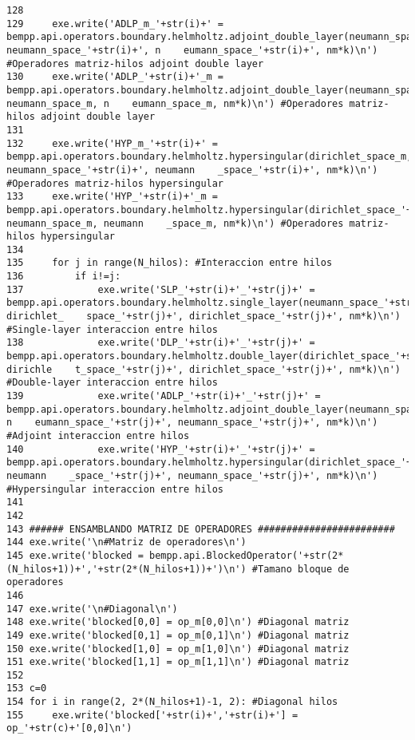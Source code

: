\documentclass[12pt,letterpaper]{article}
\numberwithin{equation}{section}
\begin{document}
\begin{lstlisting}
128 
129     exe.write('ADLP_m_'+str(i)+' = bempp.api.operators.boundary.helmholtz.adjoint_double_layer(neumann_space_m, neumann_space_'+str(i)+', n    eumann_space_'+str(i)+', nm*k)\n') #Operadores matriz-hilos adjoint double layer
130     exe.write('ADLP_'+str(i)+'_m = bempp.api.operators.boundary.helmholtz.adjoint_double_layer(neumann_space_'+str(i)+', neumann_space_m, n    eumann_space_m, nm*k)\n') #Operadores matriz-hilos adjoint double layer
131 
132     exe.write('HYP_m_'+str(i)+' = bempp.api.operators.boundary.helmholtz.hypersingular(dirichlet_space_m, neumann_space_'+str(i)+', neumann    _space_'+str(i)+', nm*k)\n') #Operadores matriz-hilos hypersingular
133     exe.write('HYP_'+str(i)+'_m = bempp.api.operators.boundary.helmholtz.hypersingular(dirichlet_space_'+str(i)+', neumann_space_m, neumann    _space_m, nm*k)\n') #Operadores matriz-hilos hypersingular
134 
135     for j in range(N_hilos): #Interaccion entre hilos
136         if i!=j:
137             exe.write('SLP_'+str(i)+'_'+str(j)+' = bempp.api.operators.boundary.helmholtz.single_layer(neumann_space_'+str(i)+', dirichlet_    space_'+str(j)+', dirichlet_space_'+str(j)+', nm*k)\n') #Single-layer interaccion entre hilos
138             exe.write('DLP_'+str(i)+'_'+str(j)+' = bempp.api.operators.boundary.helmholtz.double_layer(dirichlet_space_'+str(i)+', dirichle    t_space_'+str(j)+', dirichlet_space_'+str(j)+', nm*k)\n') #Double-layer interaccion entre hilos
139             exe.write('ADLP_'+str(i)+'_'+str(j)+' = bempp.api.operators.boundary.helmholtz.adjoint_double_layer(neumann_space_'+str(i)+', n    eumann_space_'+str(j)+', neumann_space_'+str(j)+', nm*k)\n') #Adjoint interaccion entre hilos
140             exe.write('HYP_'+str(i)+'_'+str(j)+' = bempp.api.operators.boundary.helmholtz.hypersingular(dirichlet_space_'+str(i)+', neumann    _space_'+str(j)+', neumann_space_'+str(j)+', nm*k)\n') #Hypersingular interaccion entre hilos
141 
142 
143 ###### ENSAMBLANDO MATRIZ DE OPERADORES ########################
144 exe.write('\n#Matriz de operadores\n')
145 exe.write('blocked = bempp.api.BlockedOperator('+str(2*(N_hilos+1))+','+str(2*(N_hilos+1))+')\n') #Tamano bloque de operadores
146 
147 exe.write('\n#Diagonal\n')
148 exe.write('blocked[0,0] = op_m[0,0]\n') #Diagonal matriz
149 exe.write('blocked[0,1] = op_m[0,1]\n') #Diagonal matriz
150 exe.write('blocked[1,0] = op_m[1,0]\n') #Diagonal matriz
151 exe.write('blocked[1,1] = op_m[1,1]\n') #Diagonal matriz
152 
153 c=0
154 for i in range(2, 2*(N_hilos+1)-1, 2): #Diagonal hilos
155     exe.write('blocked['+str(i)+','+str(i)+'] = op_'+str(c)+'[0,0]\n')

\end{lstlisting}
\end{document}

